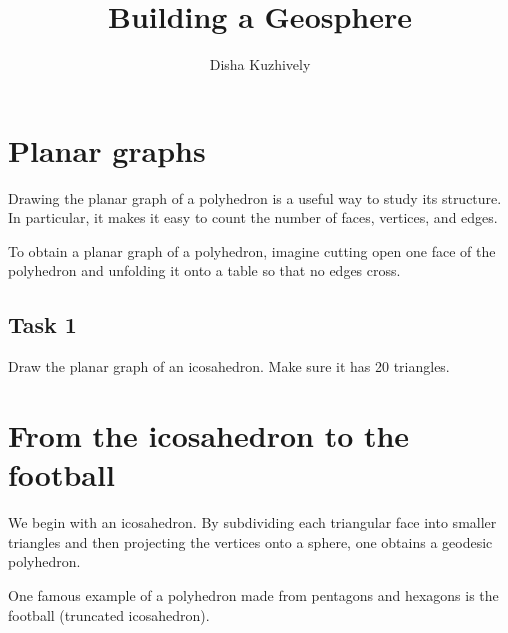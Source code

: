 \documentclass[12pt,a4paper]{tufte-handout}
\title{Building a Geosphere}
\author[dishajk]{Disha Kuzhively}
\begin{document}
\maketitle%
\section{Planar graphs}
Drawing the planar graph of a polyhedron is a useful way to study its structure. In particular, it makes it easy to count the number of faces, vertices, and edges. 

To obtain a planar graph of a polyhedron, imagine cutting open one face of the polyhedron and unfolding it onto a table so that no edges cross.
\begin{marginfigure}
      \caption{A cube and its planar graph.}%
  \label{fig:fullfig}%
\end{marginfigure}

\subsection{Task 1}
Draw the planar graph of an icosahedron. Make sure it has 20 triangles.
\section{From the icosahedron to the football}
We begin with an icosahedron. By subdividing each triangular face into smaller triangles and then projecting the vertices onto a sphere, one obtains a geodesic polyhedron.

One famous example of a polyhedron made from pentagons and hexagons is the football (truncated icosahedron).
\end{document}
